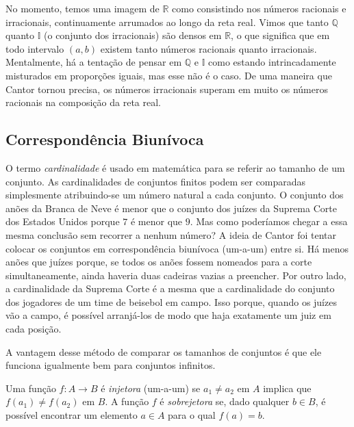 No momento, temos uma imagem de $\mathbb{R}$ como consistindo nos números racionais e irracionais, continuamente arrumados ao longo da reta real. Vimos que tanto $\mathbb{Q}$ quanto $\mathbb{I}$ (o conjunto dos irracionais) são densos em $\mathbb{R}$, o que significa que em todo intervalo $(a, b)$ existem tanto números racionais quanto irracionais. Mentalmente, há a tentação de pensar em $\mathbb{Q}$ e $\mathbb{I}$ como estando intrincadamente misturados em proporções iguais, mas esse não é o caso. De uma maneira que Cantor tornou precisa, os números irracionais superam em muito os números racionais na composição da reta real.  

\subsection{Correspondência Biunívoca}\label{subsec:correspondencia-biunivoca}

O termo \textit{cardinalidade} é usado em matemática para se referir ao tamanho de um conjunto. As cardinalidades de conjuntos finitos podem ser comparadas simplesmente atribuindo-se um número natural a cada conjunto. O conjunto dos anões da Branca de Neve é menor que o conjunto dos juízes da Suprema Corte dos Estados Unidos porque $7$ é menor que $9$. Mas como poderíamos chegar a essa mesma conclusão sem recorrer a nenhum número? A ideia de Cantor foi tentar colocar os conjuntos em correspondência biunívoca (um-a-um) entre si. Há menos anões que juízes porque, se todos os anões fossem nomeados para a corte simultaneamente, ainda haveria duas cadeiras vazias a preencher. Por outro lado, a cardinalidade da Suprema Corte é a mesma que a cardinalidade do conjunto dos jogadores de um time de beisebol em campo. Isso porque, quando os juízes vão a campo, é possível arranjá-los de modo que haja exatamente um juiz em cada posição.  

A vantagem desse método de comparar os tamanhos de conjuntos é que ele funciona igualmente bem para conjuntos infinitos.

  
\begin{definition}\label{def:injetora-sobrejetora}
Uma função $f \colon A \to B$ é \textit{injetora} (um-a-um) se $a_{1} \neq a_{2}$ em $A$ implica que $f(a_{1}) \neq f(a_{2})$ em $B$. A função $f$ é \textit{sobrejetora} se, dado qualquer $b \in B$, é possível encontrar um elemento $a \in A$ para o qual $f(a) = b$.
\end{definition}

